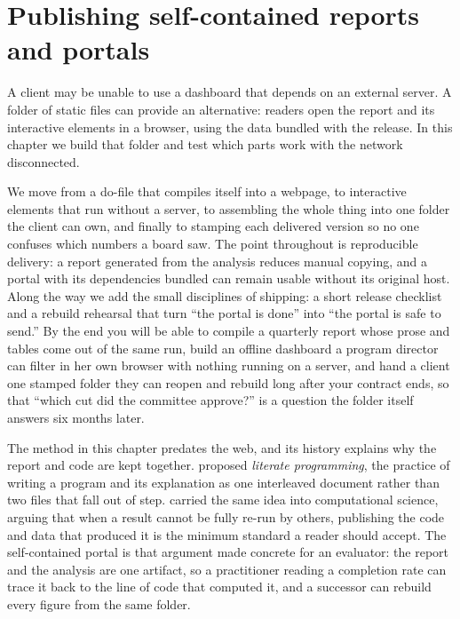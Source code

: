 \documentclass[
    a4paper,
    fontsize=10pt,
    twoside=true,
    numbers=noenddot,
]{kaobook}
\begin{document}
\chapter{Publishing self-contained reports and portals}\label{ch:portals}

A client may be unable to use a dashboard that depends on an external server. A folder of static files can provide an alternative: readers open the report and its interactive elements in a browser, using the data bundled with the release. In this chapter we build that folder and test which parts work with the network disconnected.

We move from a do-file that compiles itself into a webpage, to interactive elements that run without a server, to assembling the whole thing into one folder the client can own, and finally to stamping each delivered version so no one confuses which numbers a board saw. The point throughout is reproducible delivery: a report generated from the analysis reduces manual copying, and a portal with its dependencies bundled can remain usable without its original host. Along the way we add the small disciplines of shipping: a short release checklist and a rebuild rehearsal that turn \enquote{the portal is done} into \enquote{the portal is safe to send.} By the end you will be able to compile a quarterly report whose prose and tables come out of the same run, build an offline dashboard a program director can filter in her own browser with nothing running on a server, and hand a client one stamped folder they can reopen and rebuild long after your contract ends, so that \enquote{which cut did the committee approve?} is a question the folder itself answers six months later.

The method in this chapter predates the web, and its history explains why the report and code are kept together. \textcite{knuth1984literate} proposed \emph{literate programming}, the practice of writing a program and its explanation as one interleaved document rather than two files that fall out of step. \textcite{peng2011reproducible} carried the same idea into computational science, arguing that when a result cannot be fully re-run by others, publishing the code and data that produced it is the minimum standard a reader should accept. The self-contained portal is that argument made concrete for an evaluator: the report and the analysis are one artifact, so a practitioner reading a completion rate can trace it back to the line of code that computed it, and a successor can rebuild every figure from the same folder.
\end{document}
